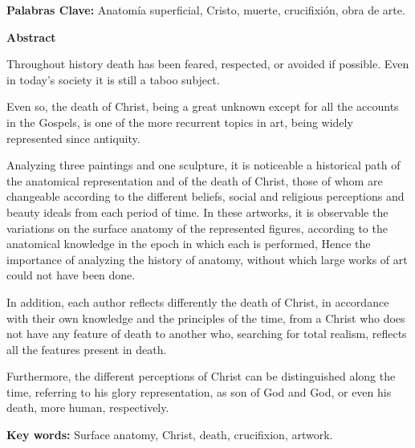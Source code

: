 
\textbf{Palabras Clave:}
Anatomía superficial, Cristo, muerte, crucifixión, obra de arte.

\vspace{10pt}

\textbf{Abstract}

Throughout history death has been feared, respected, or avoided if possible. Even in today's society it is still a taboo subject.

Even so, the death of Christ, being a great unknown except for all the accounts in the Gospels, is one of the more recurrent topics in art, being widely represented since antiquity.

Analyzing three paintings and one sculpture, it is noticeable a historical path of the anatomical representation and of the death of Christ, those of whom are changeable according to the different beliefs, social and religious perceptions and beauty ideals from each period of time.
In these artworks, it is observable the variations on the surface anatomy of the represented figures, according to the anatomical knowledge in the epoch in which each is performed, %
Hence the importance of analyzing 
the history of anatomy, without which large works of art%
could not have been done.

In addition, each author reflects differently the death of Christ, in accordance with their own knowledge and the principles of the time, from a Christ who does not have any feature of death to another who, searching for total realism, reflects %
all the features present in %
death.


Furthermore, the different perceptions of Christ can be distinguished along the time, referring to his glory representation, as son of God and God, or even his death, more human, respectively.


\textbf{Key words:}
Surface anatomy, Christ, death, crucifixion, artwork.